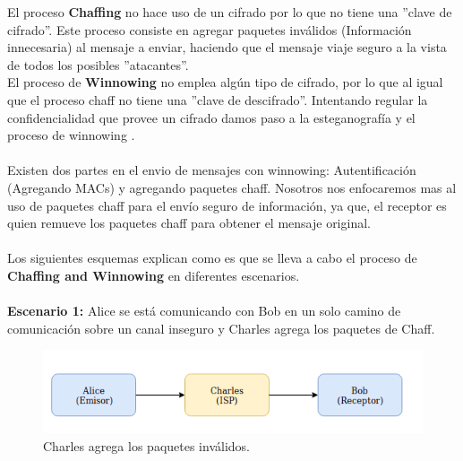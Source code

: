 \documentclass[12pt, a4paper, titlepage]{report}
\begin{document}
        El proceso \textbf{Chaffing} no hace uso de un cifrado por lo que no tiene una ''clave de cifrado''. Este proceso consiste en agregar paquetes inv\'alidos (Informaci\'on innecesaria) al mensaje a enviar, haciendo que el mensaje viaje seguro a la vista de todos los posibles ''atacantes''.\\
        El proceso de \textbf{Winnowing} no emplea alg\'un tipo de cifrado, por lo que al igual que el proceso chaff no tiene una ''clave de descifrado''. Intentando regular la confidencialidad que provee un cifrado damos paso a la esteganograf\'ia y el proceso de winnowing \cite{refCryptohraphyWithoutEncryption}.
        
        \paragraph{}
        Existen dos partes en el envio de mensajes con winnowing: Autentificaci\'on (Agregando MACs) y agregando paquetes chaff. Nosotros nos enfocaremos mas al uso de paquetes chaff para el env\'io seguro de informaci\'on, ya que, el receptor es quien remueve los paquetes chaff para obtener el mensaje original. 
        
        \paragraph{}
        Los siguientes esquemas explican como es que se lleva a cabo el proceso de \textbf{Chaffing and Winnowing} en diferentes escenarios.
        
		\paragraph{}
		\textbf{Escenario 1:} Alice se est\'a comunicando con Bob en un solo camino de comunicación sobre un canal inseguro y Charles agrega los paquetes de Chaff.\\
		\begin{figure}[!htb]
			\begin{center}	                  \includegraphics[width=14cm]{./imagenes/MarcoTeorico/chaffProcess.png}
				\caption{Charles agrega los paquetes inválidos.}
			\end{center}
		\end{figure}
		
\end{document}
